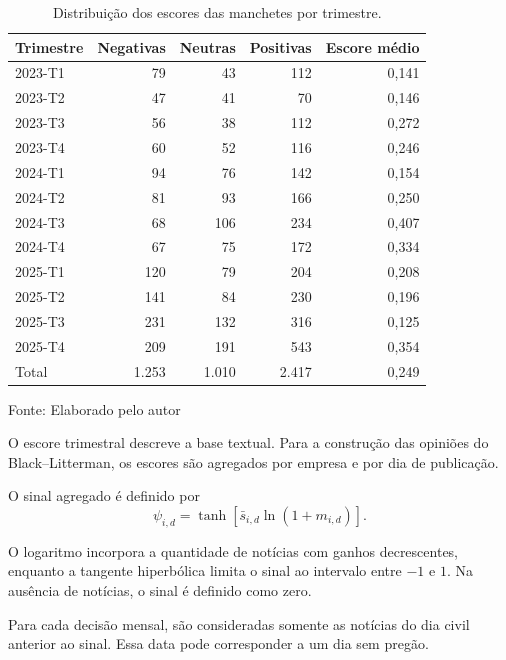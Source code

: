 \begin{table}[htbp]
    \centering
    \caption{Distribuição dos escores das manchetes por trimestre.}
    \label{tab:escores_noticias_trimestre}
    {\footnotesize
    \begin{tabular}{lrrrr}
        \hline
        Trimestre & Negativas & Neutras & Positivas & Escore médio \\
        \hline
        2023-T1 &  79 &  43 & 112 & 0,141 \\
        2023-T2 &  47 &  41 &  70 & 0,146 \\
        2023-T3 &  56 &  38 & 112 & 0,272 \\
        2023-T4 &  60 &  52 & 116 & 0,246 \\
        2024-T1 &  94 &  76 & 142 & 0,154 \\
        2024-T2 &  81 &  93 & 166 & 0,250 \\
        2024-T3 &  68 & 106 & 234 & 0,407 \\
        2024-T4 &  67 &  75 & 172 & 0,334 \\
        2025-T1 & 120 &  79 & 204 & 0,208 \\
        2025-T2 & 141 &  84 & 230 & 0,196 \\
        2025-T3 & 231 & 132 & 316 & 0,125 \\
        2025-T4 & 209 & 191 & 543 & 0,354 \\
        \hline
        Total & 1.253 & 1.010 & 2.417 & 0,249 \\
        \hline
    \end{tabular}}
    \par\smallskip
    Fonte: Elaborado pelo autor
\end{table}

O escore trimestral descreve a base textual. Para a
construção das opiniões do Black--Litterman, os escores
são agregados por empresa e por dia de publicação.

O sinal agregado é definido por
\begin{equation}
\psi_{i,d}
=
\tanh\left[
\bar{s}_{i,d}\ln(1+m_{i,d})
\right].
\label{eq:sent_suavizado_cap4}
\end{equation}

O logaritmo incorpora a quantidade de notícias com
ganhos decrescentes, enquanto a tangente hiperbólica
limita o sinal ao intervalo entre $-1$ e $1$.
Na ausência de notícias, o sinal é definido como zero.

Para cada decisão mensal, são consideradas somente
as notícias do dia civil anterior ao sinal. Essa data
pode corresponder a um dia sem pregão.

